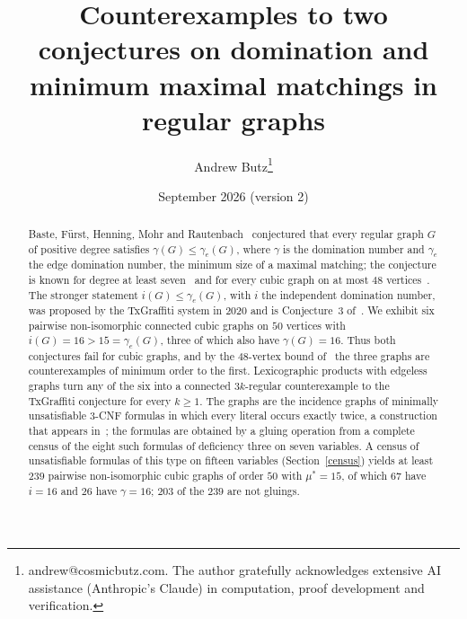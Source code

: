 \documentclass[11pt]{article}
\title{Counterexamples to two conjectures on domination and minimum maximal matchings in regular graphs}
\author{Andrew Butz\thanks{andrew@cosmicbutz.com. The author gratefully acknowledges extensive AI assistance (Anthropic's Claude) in computation, proof development and verification.}}
\date{September 2026 (version 2)}
\theoremstyle{remark}\newtheorem{remark}[theorem]{Remark}
\begin{document}
\maketitle
\begin{abstract}
Baste, F\"urst, Henning, Mohr and Rautenbach~\cite{BFHMR} conjectured that every regular graph $G$ of positive degree satisfies $\gamma(G)\le\gamma_e(G)$, where $\gamma$ is the domination number and $\gamma_e$ the edge domination number, the minimum size of a maximal matching; the conjecture is known for degree at least seven~\cite{Gupta} and for every cubic graph on at most $48$ vertices~\cite{Gupta}. The stronger statement $i(G)\le\gamma_e(G)$, with $i$ the independent domination number, was proposed by the TxGraffiti system in 2020 and is Conjecture~3 of~\cite{DBP}. We exhibit six pairwise non-isomorphic connected cubic graphs on $50$ vertices with $i(G)=16>15=\gamma_e(G)$, three of which also have $\gamma(G)=16$. Thus both conjectures fail for cubic graphs, and by the $48$-vertex bound of~\cite{Gupta} the three graphs are counterexamples of minimum order to the first. Lexicographic products with edgeless graphs turn any of the six into a connected $3k$-regular counterexample to the TxGraffiti conjecture for every $k\ge1$. The graphs are the incidence graphs of minimally unsatisfiable $3$-CNF formulas in which every literal occurs exactly twice, a construction that appears in~\cite{Gupta}; the formulas are obtained by a gluing operation from a complete census of the eight such formulas of deficiency three on seven variables. A census of unsatisfiable formulas of this type on fifteen variables (Section~\ref{census}) yields at least $239$ pairwise non-isomorphic cubic graphs of order $50$ with $\mu^*=15$, of which $67$ have $i=16$ and $26$ have $\gamma=16$; $203$ of the $239$ are not gluings.
\end{abstract}
\end{document}
